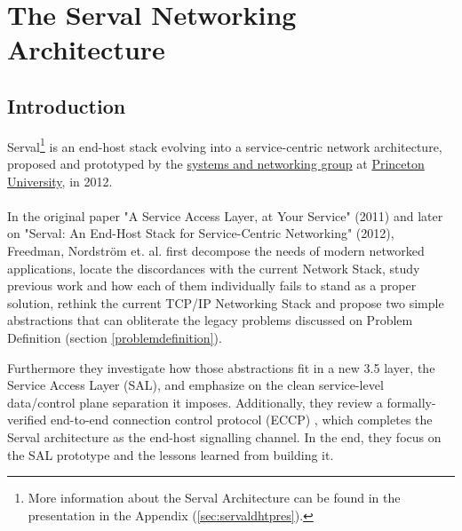 \newpage
\section{The Serval Networking Architecture}
\subsection{Introduction}
Serval\footnote{More information about the Serval Architecture can be found in the presentation in the Appendix (\ref{sec:servaldhtpres}).} is an end-host stack evolving into a service-centric network architecture, proposed and prototyped by the \href{https://sns.cs.princeton.edu/}{systems and networking group} at \href{https://www.princeton.edu}{Princeton University}, in 2012.



\paragraph{} In the original paper "A Service Access Layer, at Your Service" (2011)\cite{Freedman2011} and later on "Serval: An End-Host Stack for Service-Centric Networking" (2012)\cite{Nordstrom2012}, Freedman, Nordstr{\"o}m et. al. first decompose the needs of modern networked applications, locate the discordances with the current Network Stack, study previous work and how each of them individually fails to stand as a proper solution, rethink the current TCP/IP Networking Stack and propose two simple abstractions that can obliterate the legacy problems discussed on Problem Definition (section \ref{problemdefinition}).

Furthermore they investigate how those abstractions fit in a new 3.5 layer, the Service Access Layer (SAL), and emphasize on the clean service-level data/control plane separation it imposes.
Additionally, they review a formally-verified end-to-end connection control protocol (ECCP) , which completes the Serval architecture as the end-host signalling channel. 
In the end, they focus on the SAL prototype and the lessons learned from building it.





\iffalse
\newpage

